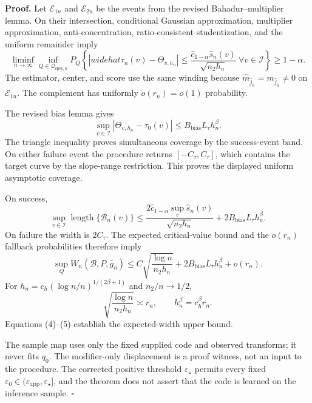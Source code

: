 \textbf{Proof.}
Let \(\mathcal E_{1n}\) and \(\mathcal E_{2n}\) be the events from the revised Bahadur--multiplier lemma. On their intersection, conditional Gaussian approximation, multiplier approximation, anti-concentration, ratio-consistent studentization, and the uniform remainder imply
\[
 \liminf_{n\to\infty}\inf_{Q\in\mathcal Q_{\mathrm{spec},n}}
 P_Q\left\{|widehat\tau_n(v)-\Theta_{v,h_n}|
 \le\frac{\widehat c_{1-\alpha}\widehat s_n(v)}
 {\sqrt{n_2h_n}}\ \forall v\in\mathcal I\right\}\ge1-\alpha. \tag{1}
\]
The estimator, center, and score use the same winding because \(\widehat m_{\widehat j_n}=m_{\widehat j_n}\ne0\) on \(\mathcal E_{1n}\). The complement has uniformly \(o(r_n)=o(1)\) probability.

The revised bias lemma gives
\[
 \sup_{v\in\mathcal I}|\Theta_{v,h_n}-\tau_0(v)|
 \le B_{\mathrm{bias}}L_\tau h_n^\beta. \tag{2}
\]
The triangle inequality proves simultaneous coverage by the success-event band. On either failure event the procedure returns \([-C_\tau,C_\tau]\), which contains the target curve by the slope-range restriction. This proves the displayed uniform asymptotic coverage.

On success,
\[
 \sup_{v\in\mathcal I}\operatorname{length}\{\mathcal B_n(v)\}
 \le\frac{2\widehat c_{1-\alpha}\sup_v\widehat s_n(v)}
 {\sqrt{n_2h_n}}+2B_{\mathrm{bias}}L_\tau h_n^\beta. \tag{3}
\]
On failure the width is \(2C_\tau\). The expected critical-value bound and the \(o(r_n)\) fallback probabilities therefore imply
\[
 \sup_QW_n(\mathcal B,P,\bar g_n)
 \le C\sqrt{\frac{\log n}{n_2h_n}}
 +2B_{\mathrm{bias}}L_\tau h_n^\beta+o(r_n). \tag{4}
\]
For \(h_n=c_h(\log n/n)^{1/(2\beta+1)}\) and \(n_2/n\to1/2\),
\[
 \sqrt{\frac{\log n}{n_2h_n}}\asymp r_n,
 \qquad h_n^\beta=c_h^\beta r_n. \tag{5}
\]
Equations (4)--(5) establish the expected-width upper bound.

The sample map uses only the fixed supplied code and observed transforms; it never fits \(q_0\). The modifier-only displacement is a proof witness, not an input to the procedure. The corrected positive threshold \(\varepsilon_\star\) permits every fixed \(\varepsilon_0\in(\varepsilon_{\mathrm{app}},\varepsilon_\star]\), and the theorem does not assert that the code is learned on the inference sample. \(\square\)